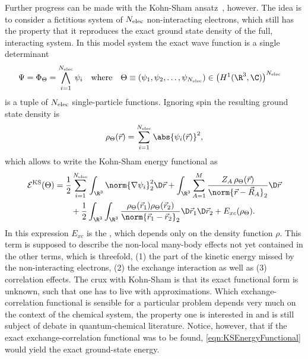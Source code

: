 Further progress can be made with the Kohn-Sham ansatz~\cite{Kohn1965}, however.
The idea is to consider a fictitious system of
$N_\text{elec}$ non-interacting electrons,
which still has the property that it reproduces the exact
ground state density of the full, interacting system.
In this model system the exact wave function is a single determinant
\begin{align*}
	\Psi &= \Phi_\Theta = \bigwedge_{i=1}^{\Nelec} \psi_i
	&&\text{where}&
	\Theta \equiv \left(\psi_1, \psi_2, \ldots, \psi_{\Nelec}\right)
	&\in \left(H^1(\R^3, \C)\right)^{\Nelec}
\end{align*}
is a tuple of $N_\text{elec}$ single-particle functions.
Ignoring spin the resulting ground state density is
\[
	\rho_\Theta(\vec{r}) = \sum_{i=1}^{\Nelec} \abs{\psi_i(\vec{r})}^2,
\]
which allows to write the Kohn-Sham energy functional as
\begin{equation}
	\begin{aligned}
	\mathcal{E}^\text{KS}(\Theta)
	&= \frac12 \sum_{i=1}^{\Nelec} \int_{\R^3} \norm{\nabla \psi_i}_2^2 \D\vec{r}
	+ \int_{\R^3} \sum_{A=1}^M
		\frac{Z_A \, \rho_\Theta(\vec{r})}{\norm{\vec{r} - \vec{R}_A}_2} \D\vec{r} \\
	&\hspace{20pt}
	+ \frac12 \int_{\R^3}\int_{\R^3}
		\frac{\rho_\Theta(\vec{r}_1) \rho_\Theta(\vec{r}_2)}
			{\norm{\vec{r}_1 - \vec{r}_2}_2} \D\vec{r}_1 \D\vec{r}_2
	+ E_{xc}(\rho_\Theta).
	\end{aligned}
	\label{eqn:KSEnergyFunctional}
\end{equation}
In this expression $E_{xc}$ is the ,
which depends only on the density function $\rho$.
This term is supposed to describe the non-local
many-body effects not yet contained in the other terms,
which is threefold,
(1) the part of the kinetic energy missed by the non-interacting electrons,
(2) the exchange interaction as well as (3) correlation effects.
The crux with Kohn-Sham \DFT is that its exact functional form is unknown,
such that one has to live with approximations.
Which exchange-correlation functional is sensible for a particular
problem depends very much on the context of the chemical system,
the property one is interested in and is still subject of debate
in quantum-chemical literature.
Notice, however, that if the exact exchange-correlation functional was to be found,
\eqref{eqn:KSEnergyFunctional} would yield the exact ground-state energy.

